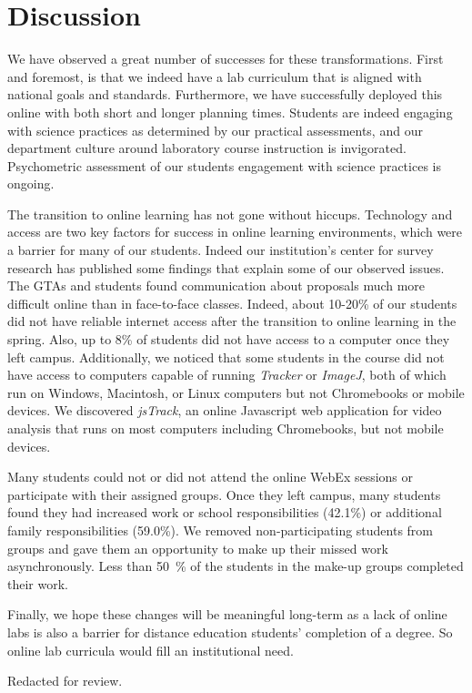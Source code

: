 \documentclass[aip, numerical, preprint]{revtex4-2}
\begin{document}
\section{Discussion}
We have observed a great number of successes for these transformations.  First and foremost, is
that we indeed have a lab curriculum that is aligned with national goals and
standards. Furthermore, we have successfully deployed this online with both short and longer
planning times.  Students are indeed engaging with science practices as determined by our
practical assessments, and our department culture around laboratory course instruction is
invigorated. Psychometric assessment of our students engagement with science practices is
ongoing.

The transition to online learning has not gone without hiccups.  Technology and access are two
key factors for success in online learning environments, which were a barrier for many of our
students.  Indeed our institution's center for survey research has published some findings that
explain some of our observed issues.\citep{ECUcovidSurvey} The GTAs and students found
communication about proposals much more difficult online than in face-to-face classes.  Indeed,
about 10-20\% of our students did not have reliable internet access after the transition to
online learning in the spring.\citep{ECUcovidSurvey} Also, up to 8\% of students did not have
access to a computer once they left campus.\citep{ECUcovidSurvey} Additionally, we noticed that
some students in the course did not have access to computers capable of running \emph{Tracker}
or \emph{ImageJ}, both of which run on Windows, Macintosh, or Linux computers but not
Chromebooks or mobile devices. We discovered \emph{jsTrack}\citep{jstrack}, an online
Javascript web application for video analysis that runs on most computers including
Chromebooks, but not mobile devices.

Many students could not or did not attend the online WebEx sessions or participate with their
assigned groups.  Once they left campus, many students found they had increased work or school
responsibilities (42.1\%) or additional family responsibilities (59.0\%).\citep{ECUcovidSurvey}
We removed non-participating students from groups and gave them an opportunity to make up their
missed work asynchronously. Less than \SI{50}{\percent} of the students in the make-up groups
completed their work.

Finally, we hope these changes will be meaningful long-term as a lack of online labs is also a
barrier for distance education students' completion of a degree.  So online lab curricula would
fill an institutional need.


\begin{acknowledgments}
  Redacted for review.%
\end{acknowledgments}


\end{document}
